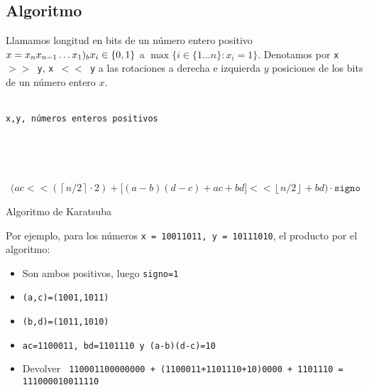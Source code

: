 \documentclass[a4paper, 11pt]{article} %
\begin{document}
\subsection{Algoritmo}
Llamamos longitud en bits de un número entero positivo $x=x_{n}x_{n-1}\ldots x_1)_b \quad \\ x_i \in \{0,1\}$
a $\max\{i\in \{1\ldots n\} : x_i = 1\}$.
Denotamos por \texttt{x $>>$ y}, \texttt{x $<<$ y} a las rotaciones a derecha e izquierda $y$ posiciones
de los bits de un número entero $x$.
\begin{algorithm}[H]
	\begin{algorithmic}[1]
	  \REQUIRE \ \\
	  \texttt{x,y, números enteros positivos}\\\
	  \IF{[x<0 \AND y<0] \OR [x>0 \AND y>0]}
	  \ELSE
	  \ENDIF\\
	  \\\
	  \IF{\texttt{longitud} $<$ 2}
	  \ELSE
	  \ENDIF \\\
	  \RETURN\\\ \small$\bigg( ac << (\left\lceil n/2 \right\rceil \cdot 2) +
	    \bigg[(a-b)(d-c) +ac +bd\bigg] << \left\lfloor n/2\right\rfloor + 
	    bd \bigg) \cdot \texttt{signo}$\normalsize	  
	\end{algorithmic}
    \caption{Algoritmo de Karatsuba}
    \label{multiplicacion}
\end{algorithm}
Por ejemplo, para los números \texttt{x = 10011011, y = 10111010}, el producto por el algoritmo:
\begin{itemize}
\item Son ambos positivos, luego \texttt{signo=1}
\item \texttt{(a,c)=(1001,1011)}
\item \texttt{(b,d)=(1011,1010)}
\item \texttt{ac=1100011, bd=1101110 y (a-b)(d-c)=10}
\item Devolver \texttt{ 110001100000000 + (1100011+1101110+10)0000 + 1101110 = 111000010011110}
\end{itemize} 
\end{document}

